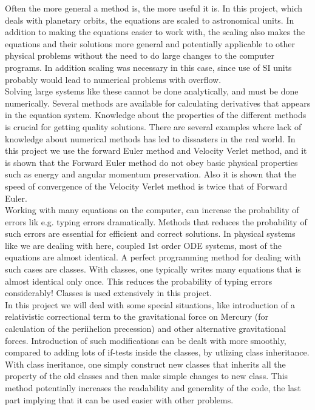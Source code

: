 \documentclass{article}
\begin{document}
Often the more general a method is, the more useful it is. In this project, which deals with planetary orbits, the equations are scaled to astronomical units. In addition to making the equations easier to work with, the scaling also makes the equations and their solutions more general and potentially applicable to other physical problems without the need to do large changes to the computer programs. In addition scaling was necessary in this case, since use of SI units probably would lead to numerical problems with overflow.\\

Solving large systems like these cannot be done analytically, and must be done numerically. Several methods are available for calculating derivatives that appears in the equation system. Knowledge about the properties of the different methods is crucial for getting quality solutions. There are several examples where lack of knowledge about numerical methods has led to dissasters in the real world. In this project we use the forward Euler method and Velocity Verlet method, and it is shown that the Forward Euler method do not obey basic physical properties such as energy and angular momentum preservation. Also it is shown that the speed of convergence of the Velocity Verlet method is twice that of Forward Euler.\\

Working with many equations on the computer, can increase the probability of errors lik e.g. typing errors dramatically. Methods that reduces the probability of such errors are essential for efficient and correct solutions. In physical systems like we are dealing with here, coupled 1st order ODE systems, most of the equations are almost identical. A perfect programming method for dealing with such cases are classes. With classes, one typically writes many equations that is almost identical only once. This reduces the probability of typing errors considerably! Classes is used extensively in this project.\\

In this project we will deal with some special situations, like introduction of a relativistic correctional term to the gravitational force on Mercury (for calculation of the periihelion precession) and other alternative gravitational forces. Introduction of such modifications can be dealt with more smoothly, compared to adding lots of if-tests inside the classes, by utlizing class inheritance. With class ineritance, one simply construct new classes that inherits all the property of the old classes and then make simple changes to new class. This method potentially increases the readability and generality of the code, the last part implying that it can be used easier with other problems.\\
\end{document}
